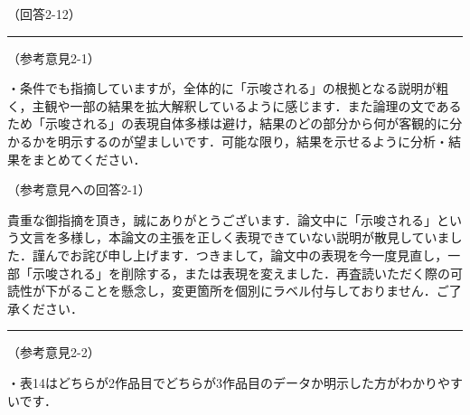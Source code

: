 \documentclass{jarticle} %
\def\subsection#1{ \vspace{1pc} {\gt #1} }
\def\nextans{ \vspace{2pc} \hrule }
\begin{document}
\subsection{（回答2-12）}


\newpage
\nextans
\subsection{（参考意見2-1）}

・条件でも指摘していますが，全体的に「示唆される」の根拠となる説明が粗く，主観や一部の結果を拡大解釈しているように感じます．また論理の文であるため「示唆される」の表現自体多様は避け，結果のどの部分から何が客観的に分かるかを明示するのが望ましいです．可能な限り，結果を示せるように分析・結果をまとめてください．

\subsection{（参考意見への回答2-1）}

貴重な御指摘を頂き，誠にありがとうございます．論文中に「示唆される」という文言を多様し，本論文の主張を正しく表現できていない説明が散見していました．謹んでお詫び申し上げます．つきまして，論文中の表現を今一度見直し，一部「示唆される」を削除する，または表現を変えました．再査読いただく際の可読性が下がることを懸念し，変更箇所を個別にラベル付与しておりません．ご了承ください．



\newpage
\nextans
\subsection{（参考意見2-2）}

・表14はどちらが2作品目でどちらが3作品目のデータか明示した方がわかりやすいです．
\end{document}
